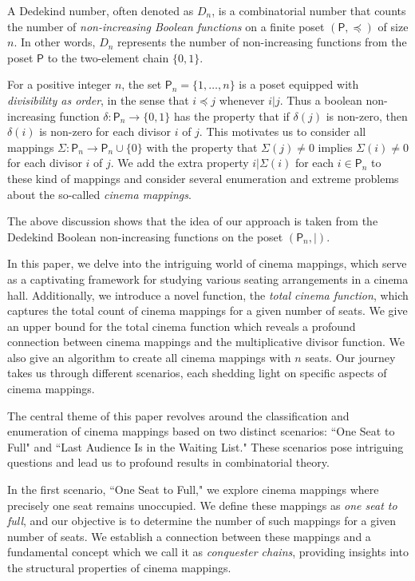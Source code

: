 \documentclass{amsart}
\theoremstyle{definition}
\begin{document}
A Dedekind number, often denoted as $D_n$, is a combinatorial number that counts the number of \textit{non-increasing Boolean functions} on a finite poset $(\mathsf{P},\preceq)$ of size $n$. In other words, $D_n$ represents the number of non-increasing functions from the poset $\mathsf{P}$ to the two-element chain $\{0,1\}$. 

For a positive integer $n$, the set $\mathsf{P}_n=\{1,\ldots,n\}$ is a poset equipped with \textit{divisibility as order}, in the sense that $i\preceq j$ whenever $i|j$. Thus a boolean non-increasing function $\delta:\mathsf{P}_n\to\{0,1\}$ has the property that if $\delta(j)$ is non-zero, then $\delta(i)$ is non-zero for each divisor $i$ of $j$. 
This motivates us to consider all mappings $\Sigma:\mathsf{P}_n\to\mathsf{P}_n\cup\{0\}$ with the property that $\Sigma(j)\neq0$ implies $\Sigma(i)\neq0$ for each divisor $i$ of $j$. We add the extra property $i|\Sigma(i)$ for each $i\in\mathsf{P}_n$ to these kind of mappings and consider several enumeration and extreme problems about the so-called \textit{cinema mappings}. 

The above discussion shows that the idea of our approach is taken from the Dedekind Boolean non-increasing functions on the poset $(\mathsf{P}_n,|)$.

In this paper, we delve into the intriguing world of cinema mappings, which serve as a captivating framework for studying various seating arrangements in a cinema hall.  Additionally, we introduce a novel function, the \textit{total cinema function}, which captures the total count of cinema mappings for a given number of seats. We give an upper bound for the total cinema function which reveals a profound connection between cinema mappings and the multiplicative divisor function. We also give an algorithm to create all cinema mappings with $n$ seats. Our journey takes us through different scenarios, each shedding light on specific aspects of cinema mappings.

The central theme of this paper revolves around the classification and enumeration of cinema mappings based on two distinct scenarios: ``One Seat to Full" and ``Last Audience Is in the Waiting List." These scenarios pose intriguing questions and lead us to profound results in combinatorial theory.

In the first scenario, ``One Seat to Full," we explore cinema mappings where precisely one seat remains unoccupied. We define these mappings as \textit{one seat to full}, and our objective is to determine the number of such mappings for a given number of seats. We establish a connection between these mappings and a fundamental concept which we call it as \textit{conquester chains}, providing insights into the structural properties of cinema mappings.
\end{document}
